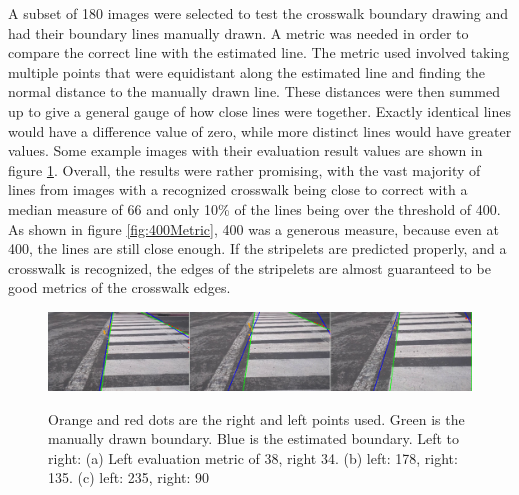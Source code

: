 \documentclass[12pt]{ucthesis}
\newcommand{\captionfonts}{\small\bf\ssp}
\begin{document}
A subset of 180 images were selected to test the crosswalk boundary drawing and had their boundary lines manually drawn. A metric was needed in order to compare the correct line with the estimated line. The metric used involved taking multiple points that were equidistant along the estimated line and finding the normal distance to the manually drawn line. These distances were then summed up to give a general gauge of how close lines were together. Exactly identical lines would have a difference value of zero, while more distinct lines would have greater values. Some example images with their evaluation result values are shown in figure \ref{fig:LinesUsingJustGoodStartAndEnds2}. Overall, the results were rather promising, with the vast majority of lines from images with a recognized crosswalk being close to correct with a median measure of 66 and only 10\% of the lines being over the threshold of 400. As shown in figure \ref{fig:400Metric}, 400 was a generous measure, because even at 400, the lines are still close enough.  If the stripelets are predicted properly, and a crosswalk is recognized, the edges of the stripelets are almost guaranteed to be good metrics of the crosswalk edges.

\begin{figure}[t]
\begin{center}
\includegraphics[width=15cm]{LinesUsingJustGoodStartAndEnds2.png}
\captionfonts
\caption[Boundary Line Estimation Results]{Orange and red dots are the right and left points used. Green is the manually drawn boundary. Blue is the estimated boundary. Left to right: (a) Left evaluation metric of 38, right 34. (b) left: 178, right: 135. (c) left: 235, right: 90}
\label{fig:LinesUsingJustGoodStartAndEnds2}
\end{center}
\end{figure}
\end{document}
